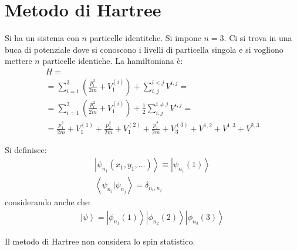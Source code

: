 \section{Metodo di Hartree} %
Si ha un sistema con $n$ particelle identitche. Si impone $n=3$. Ci si trova in una buca di potenziale dove si conoscono i livelli di particella singola e si vogliono mettere $n$ particelle identiche. La hamiltoniana è:
\begin{equation}\begin{split}
H=\\
=\sum_{i=1}^3{\left(\frac{p_i^2}{2m}+V_1^{\left(i\right)}\right)}+\sum_{i,j}^{i<j}{V^{i,j}}=\\
=\sum_{i=1}^3{\left(\frac{p_i^2}{2m}+V_1^{\left(i\right)}\right)}+\frac{1}{2}\sum_{i,j}^{i\neq j}{V^{i,j}}=\\
=\frac{p_1^2}{2m}+V_1^{\left(1\right)}+\frac{p_2^2}{2m}+V_1^{\left(2\right)}+\frac{p_i^2}{2m}+V_3^{\left(3\right)}+V^{1,2}+V^{1,3}+V^{2,3}
\end{split}\end{equation}

Si definisce:
\begin{equation}\begin{split}
\left |\psi _{n_1}\left(x_1,y_1,\dots\right) \right\rangle\equiv \left |\psi _{n_1}\left(1\right) \right\rangle\\
\left\langle \psi _{n_i}|\psi _{n_j} \right\rangle=\delta_{n_i,n_j}
\end{split}\end{equation}
considerando anche che:
\begin{equation}\begin{split}
\left |\psi  \right\rangle=\left |\phi_{n_1}\left(1\right) \right\rangle\left |\phi_{n_2}\left(2\right) \right\rangle\left |\phi_{n_3}\left(3\right) \right\rangle
\end{split}\end{equation}

Il metodo di Hartree non considera lo spin statistico.

